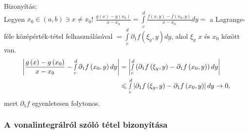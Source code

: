 \documentclass[12pt,a4paper]{scrartcl}
\newenvironment{bizonyitas}{}{}
\begin{document}
\begin{bizonyitas}

Bizonyítás:\\
Legyen \(x_{0} \in \left( {a,b} \right) \ni x \neq x_{0}\)!
\(\frac{g\left( x \right) - g\left( x_{0} \right)}{x - x_{0}} = {\int\limits_{c}^{d}{\frac{f\left( {x,y} \right) - f\left( {x_{0},y} \right)}{x - x_{0}}dy}} =\)
a Lagrange-féle középérték-tétel felhasználásával
\(= {\int\limits_{c}^{d}{\partial_{1}f\left( {\xi_{y},y} \right)dy}}\),
ahol \(\xi_{y}\) \(x\) és \(x_{0}\) között van. \[\begin{aligned}
  \left| {\frac{{g\left( x \right) - g\left( {{x_0}} \right)}}{{x - {x_0}}} - \mathop \smallint \limits_c^d {\partial _1}f\left( {{x_0},y} \right)dy} \right| &  = \left| {\mathop \smallint \limits_c^d \left( {{\partial _1}f\left( {{\xi _y},y} \right) - {\partial _1}f\left( {{x_0},y} \right)} \right)dy} \right| \\ 
   &  \leqslant \mathop \smallint \limits_c^d \left| {{\partial _1}f\left( {{\xi _y},y} \right) - {\partial _1}f\left( {{x_0},y} \right)} \right|dy \to 0, \\ 
\end{aligned} \] mert \(\partial_{1}f\) egyenletesen folytonos.

\end{bizonyitas}

\hypertarget{a-vonalintegralrol-szolo-tetel-bizonyitasa}{%
\subsubsection{A vonalintegrálról szóló tétel
bizonyítása}\label{a-vonalintegralrol-szolo-tetel-bizonyitasa}}
\end{document}
